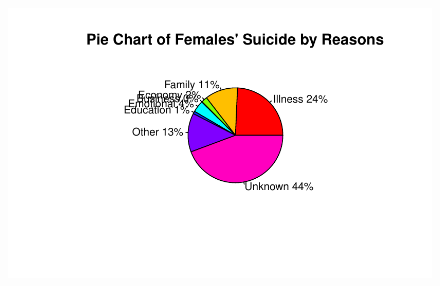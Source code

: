 \documentclass[
  11pt,
  a4paper,
  DIV=11,
  numbers=noendperiod]{scrartcl}
\begin{document}
\begin{figure}[H]

{\centering \includegraphics{analysis_files/figure-pdf/unnamed-chunk-21-1.pdf}

}

\end{figure}
\end{document}
